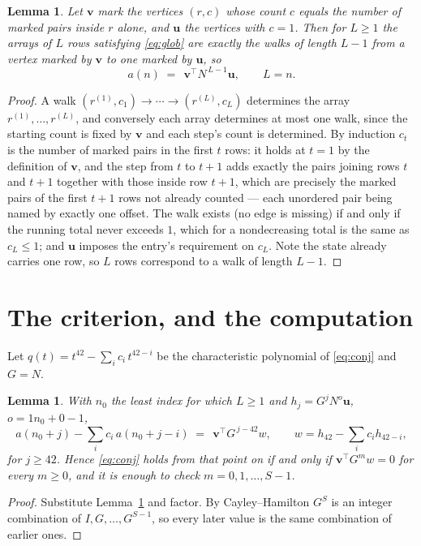 \documentclass[11pt,a4paper]{article}
\theoremstyle{plain}
\newtheorem{lemma}[theorem]{Lemma}
\theoremstyle{definition}
\begin{document}
\begin{lemma}\label{lem:walk}
Let $\mathbf{v}$ mark the vertices $(r,c)$ whose count $c$ equals the number of marked pairs
inside $r$ alone, and $\mathbf{u}$ the vertices with $c=1$. Then for $L\ge1$ the arrays
of $L$ rows satisfying \eqref{eq:glob} are exactly the walks of length $L-1$ from a
vertex marked by $\mathbf{v}$ to one marked by $\mathbf{u}$, so
\[
a(n)\;=\;\,\mathbf{v}^{\!\top}N^{\,L-1}\mathbf{u},\qquad L=n .
\]
\end{lemma}

\begin{proof}
A walk $(r^{(1)},c_1)\to\cdots\to(r^{(L)},c_L)$ determines the array
$r^{(1)},\dots,r^{(L)}$, and conversely each array determines at most one walk, since the
starting count is fixed by $\mathbf{v}$ and each step's count is determined. By induction
$c_t$ is the number of marked pairs in the first $t$ rows: it holds at $t=1$ by the
definition of $\mathbf{v}$, and the step from $t$ to $t+1$ adds exactly the pairs joining
rows $t$ and $t+1$ together with those inside row $t+1$, which are precisely the marked
pairs of the first $t+1$ rows not already counted --- each unordered pair being named by
exactly one offset. The walk exists (no edge is missing) if and only if the running total
never exceeds $1$, which for a nondecreasing total is the same as $c_L\le1$; and
$\mathbf{u}$ imposes the entry's requirement on $c_L$. Note the state already carries one
row, so $L$ rows correspond to a walk of length $L-1$.
\end{proof}

\section{The criterion, and the computation}

Let $q(t)=t^{42}-\sum_i c_i\,t^{42-i}$ be the characteristic polynomial of
\eqref{eq:conj} and $G=N$.

\begin{lemma}\label{lem:crit}
With $n_0$ the least index for which $L\ge1$ and $h_j=G^{j}N^{o}\mathbf{u}$,
$o=1n_0+0-1$,
\[
a(n_0+j)-\sum_i c_i\,a(n_0+j-i)\;=\;\,\mathbf{v}^{\!\top}G^{\,j-42}w,
\qquad w=h_{42}-\sum_i c_i h_{42-i},
\]
for $j\ge42$. Hence \eqref{eq:conj} holds from that point on if and only if
$\mathbf{v}^{\!\top}G^{m}w=0$ for every $m\ge0$, and it is enough to check
$m=0,1,\dots,S-1$.
\end{lemma}

\begin{proof}
Substitute Lemma~\ref{lem:walk} and factor. By Cayley--Hamilton $G^{S}$ is an integer
combination of $I,G,\dots,G^{S-1}$, so every later value is the same combination of earlier
ones.
\end{proof}
\end{document}
